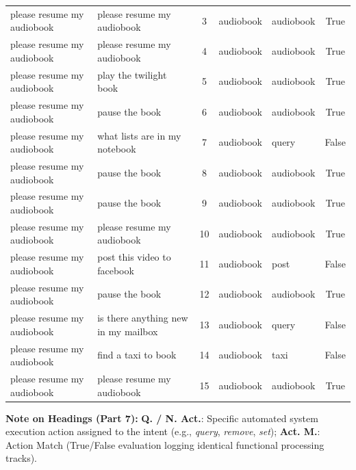 {\begin{longtable}{p{4.0cm} p{4.0cm} c ll c}
please resume my audiobook & please resume my audiobook & 3 & audiobook & audiobook & True \\
please resume my audiobook & please resume my audiobook & 4 & audiobook & audiobook & True \\
please resume my audiobook & play the twilight book & 5 & audiobook & audiobook & True \\
please resume my audiobook & pause the book & 6 & audiobook & audiobook & True \\
please resume my audiobook & what lists are in my notebook & 7 & audiobook & query & False \\
please resume my audiobook & pause the book & 8 & audiobook & audiobook & True \\
please resume my audiobook & pause the book & 9 & audiobook & audiobook & True \\
please resume my audiobook & please resume my audiobook & 10 & audiobook & audiobook & True \\
please resume my audiobook & post this video to facebook & 11 & audiobook & post & False \\
please resume my audiobook & pause the book & 12 & audiobook & audiobook & True \\
please resume my audiobook & is there anything new in my mailbox & 13 & audiobook & query & False \\
please resume my audiobook & find a taxi to book & 14 & audiobook & taxi & False \\
please resume my audiobook & please resume my audiobook & 15 & audiobook & audiobook & True \\
\bottomrule
\end{longtable}
}
\vspace{0.1cm}
{\footnotesize\noindent\raggedright \textbf{Note on Headings (Part 7):} \textbf{Q. / N. Act.}: Specific automated system execution action assigned to the intent (e.g., \textit{query}, \textit{remove}, \textit{set}); \textbf{Act. M.}: Action Match (True/False evaluation logging identical functional processing tracks).\par}

